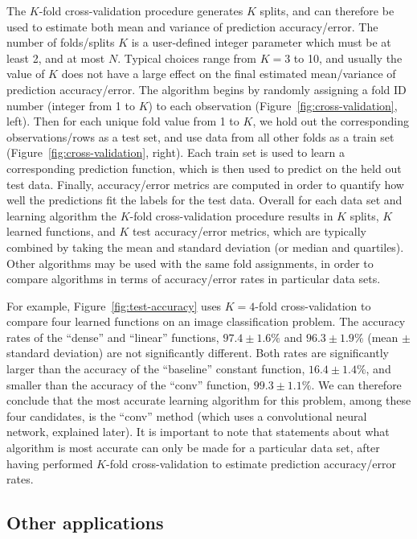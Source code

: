 \documentclass[12pt]{article}
\begin{document}
The $K$-fold cross-validation procedure generates $K$ splits, and can
therefore be used to estimate both mean and variance of prediction
accuracy/error. The number of folds/splits $K$ is a user-defined
integer parameter which must be at least 2, and at most $N$. Typical
choices range from $K=3$ to 10, and usually the value of $K$ does not
have a large effect on the final estimated mean/variance of prediction
accuracy/error. The algorithm begins by randomly assigning a fold ID
number (integer from 1 to $K$) to each observation
(Figure~\ref{fig:cross-validation}, left). Then for each unique fold
value from 1 to $K$, we hold out the corresponding observations/rows
as a test set, and use data from all other folds as a train set
(Figure~\ref{fig:cross-validation}, right). Each train set is used to
learn a corresponding prediction function, which is then used to
predict on the held out test data. Finally, accuracy/error metrics are
computed in order to quantify how well the predictions fit the labels
for the test data. Overall for each data set and learning algorithm
the $K$-fold cross-validation procedure results in $K$ splits, $K$
learned functions, and $K$ test accuracy/error metrics, which are
typically combined by taking the mean and standard deviation (or
median and quartiles). Other algorithms may be used with the same fold
assignments, in order to compare algorithms in terms of accuracy/error
rates in particular data sets.

For example, Figure~\ref{fig:test-accuracy} uses $K=4$-fold
cross-validation to compare four learned functions on an image
classification problem. The accuracy rates of the ``dense'' and
``linear'' functions, $97.4 \pm 1.6 \%$ and $96.3 \pm 1.9 \%$ (mean
$\pm$ standard deviation) are not significantly different. Both rates
are significantly larger than the accuracy of the ``baseline''
constant function, $16.4 \pm 1.4 \%$, and smaller than the accuracy of
the ``conv'' function, $99.3 \pm 1.1 \%$. We can therefore conclude
that the most accurate learning algorithm for this problem, among
these four candidates, is the ``conv'' method (which uses a
convolutional neural network, explained later).  It is important to
note that statements about what algorithm is most accurate can only be made for a particular data set, after having performed
$K$-fold cross-validation to estimate prediction accuracy/error rates.

\subsection{Other applications}
\end{document}
